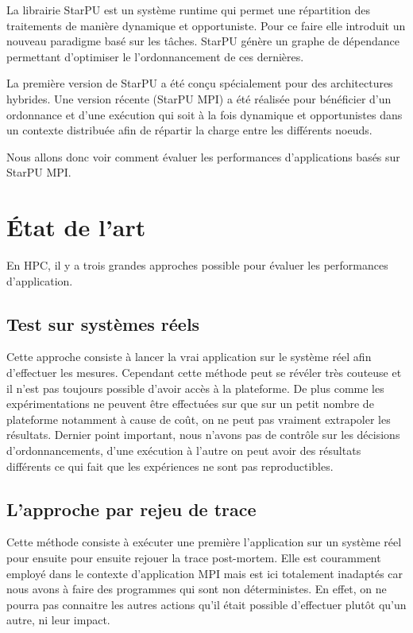 \documentclass[smallextended]{svjour3}
\begin{document}
La librairie StarPU est un système runtime qui permet une
répartition des traitements de manière dynamique et opportuniste. 
Pour ce faire elle introduit un nouveau paradigme basé sur les
tâches. StarPU génère un graphe de dépendance permettant
d'optimiser le l'ordonnancement de ces dernières.

La première version de StarPU a été conçu spécialement pour des
architectures hybrides. Une version récente (StarPU MPI) a été
réalisée pour bénéficier d'un ordonnance et d'une exécution qui
soit à la fois dynamique et opportunistes dans un contexte
distribuée afin de répartir la charge entre les différents
noeuds.

Nous allons donc voir comment évaluer les performances
d'applications basés sur StarPU MPI.

\section{État de l'art}
\label{sec-2}
En HPC, il y a trois grandes approches possible pour évaluer les
performances d'application.
\subsection{Test sur systèmes réels}
\label{sec-2-1}
Cette approche consiste à lancer la vrai application sur le système
réel afin d'effectuer les mesures. Cependant cette méthode peut se 
révéler très couteuse et il n'est pas toujours possible d'avoir
accès à la plateforme. De plus comme les expérimentations ne
peuvent être effectuées sur que sur un petit nombre de plateforme
notamment à cause de coût, on ne peut pas vraiment extrapoler les
résultats. Dernier point important, nous n'avons pas de contrôle
sur les décisions d'ordonnancements, d'une exécution à l'autre on
peut avoir des résultats différents ce qui fait que les
expériences ne sont pas reproductibles. 
\subsection{L'approche par rejeu de trace}
\label{sec-2-2}
Cette méthode consiste à exécuter une première l'application sur
un système réel pour ensuite pour ensuite rejouer la trace
post-mortem. Elle est couramment employé dans le contexte
d'application MPI mais est ici totalement inadaptés car nous avons
à faire des programmes qui sont non déterministes. En effet, on ne
pourra pas connaitre les autres actions qu'il était possible
d'effectuer plutôt qu'un autre, ni leur impact.
\end{document}
